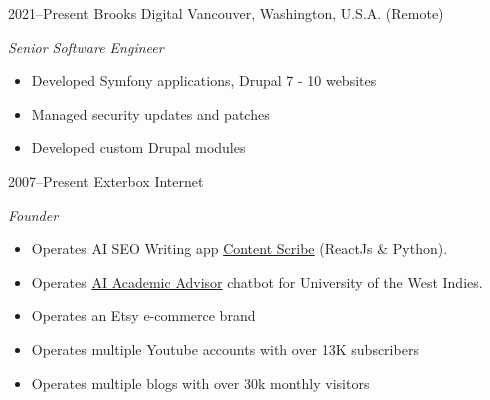\documentclass[]{friggeri-cv} %
\begin{document}
\begin{entrylist}

\entry
{2021--Present}
{Brooks Digital}
{Vancouver, Washington, U.S.A. (Remote)}
{\emph{Senior Software Engineer}
\begin{itemize}
\item Developed Symfony applications, Drupal 7 - 10 websites
\item Managed security updates and patches
\item Developed custom Drupal modules
\end{itemize}}

\entry
{2007--Present}
{Exterbox}
{Internet}
{\emph{Founder}
\begin{itemize}
\item Operates AI SEO Writing app \href{https://contentscibe.aismith.cc}{Content Scribe} (ReactJs \& Python).
\item Operates \href{https://uwi.edu/academic-advisor.php}{AI Academic Advisor} chatbot for University of the West Indies.
\item Operates an Etsy e-commerce brand
\item Operates multiple Youtube accounts with over 13K subscribers
\item Operates multiple blogs with over 30k monthly visitors
\end{itemize}}



\end{entrylist}
\end{document}
